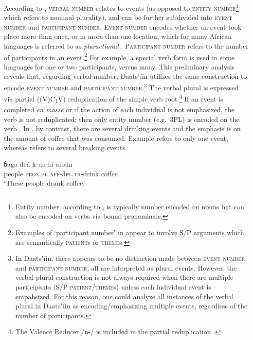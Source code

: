 \documentclass[output=paper]{langsci/langscibook}
\begin{document}
According to \citet[246-249]{Corbett2000}, \textsc{verbal number} relates to events (as opposed to \textsc{entity number}\footnote{Entity number, according to \citet{Corbett2000}, is typically number encoded on nouns but can also be encoded on verbs via bound pronominals.} which refers to nominal plurality), and can be further subdivided into \textsc{event number} and \textsc{participant number}. \textsc{Event number} encodes whether an event took place more than once, or in more than one location, which for many African languages is referred to as \textit{pluractional} \citep[243]{Corbett2000}. \textsc{Participant number} refers to the number of participants in an event.\footnote{Examples of ‘participant number’ in \citet[247-8]{Corbett2000} appear to involve S/P arguments which are semantically \textsc{patient}s or \textsc{theme}s.} For example, a special verb form is used in some languages for one or two participants, versus many. This preliminary analysis reveals that, regarding verbal number, Daatsʼ\'{i}in utilizes the same construction to encode \textsc{event number} and \textsc{participant number}.\footnote{In Daatsʼ\'{i}in, there appears to be no distinction made between \textsc{event number }and \textsc{participant number}; all are interpreted as plural events. However, the verbal plural construction is not always required when there are multiple participants (S/P \textsc{patient}/\textsc{theme}s) unless each individual event is empahsized. For this reason, one could analyze all instances of the verbal plural in Daatsʼ\'{i}in as encoding/emphasizing multiple events, regardless of the number of participants.} The verbal plural is expressed via partial ((V)C\textsubscript{1}V) reduplication of the simple verb root.\footnote{The Valence Reducer /n-/ is included in the partial reduplication .} If an event is completed \textit{en masse} or if the action of each individual is not emphasized, the verb is not reduplicated; then only entity number (e.g.\ 3PL) is encoded on the verb . In , by contrast, there are several drinking events and the emphasis is on the amount of coffee that was consumed. Example  refers to only one event, whereas  refers to several breaking events. 

\ea\label{ex:ahlandc:36}
\gll
ɓaga  de\'{a}  k-uu-f\'{a}                   alb\'{u}n \\
people \textsc{prox.pl}  \textsc{aff-3pl.tr}{}-drink   coffee \\
\glt
‘These people drank coffee.’
\z
\end{document}
